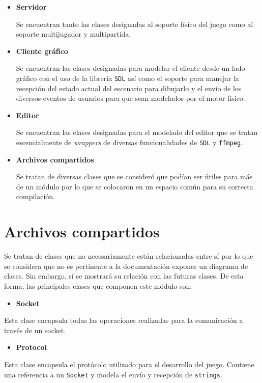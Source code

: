 \documentclass[a4paper]{article}
\begin{document}
\begin{itemize}
	\item \textbf{Servidor}

Se encuentran tanto las clases designadas al soporte físico del juego como al soporte multijugador y multipartida.

	\item \textbf{Cliente gráfico}
	
Se encuentran las clases designadas para modelar el cliente desde un lado gráfico con el uso de la librería \texttt{SDL} así como el soporte para manejar la recepción del estado actual del escenario para dibujarlo y el envío de los diversos eventos de usuarios para que sean modelados por el motor físico.
	\item \textbf{Editor}
	
Se encuentran las clases designadas para el modelado del editor que se tratan escencialmente de \textit{wrappers} de diversas funcionalidades de \texttt{SDL} y \texttt{ffmpeg}.

	\item \textbf{Archivos compartidos}
	
Se tratan de diversas clases que se consideró que podían ser útiles para más de un módulo por lo que se colocaron en un espacio común para su correcta compilación.
\end{itemize}

\section{Archivos compartidos}

Se tratan de clases que no necesariamente están relacionadas entre sí por lo que se considera que no es pertinente a la documentación exponer un diagrama de clases. Sin embargo, sí se mostrará su relación con las futuras clases. De esta forma, las principales clases que componen este módulo son:

\begin{itemize}
	\item \textbf{Socket}
\end{itemize}

Esta clase encapsula todas las operaciones realizadas para la comunicación a través de un socket.

\begin{itemize}
	\item \textbf{Protocol}
\end{itemize}

Esta clase encapsula el protócolo utilizado para el desarrollo del juego. Contiene una referencia a un \texttt{Socket} y modela el envío y recepción de \texttt{strings}.
\end{document}
